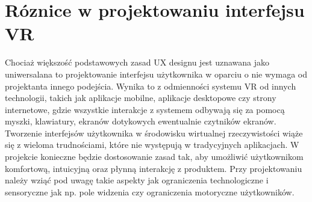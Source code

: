 \section{Róznice w projektowaniu interfejsu VR}
Chociaż większość podstawowych zasad UX designu jest uznawana jako uniwersalana to projektowanie interfejsu użytkownika w oparciu o nie wymaga od projektanta innego podejścia. Wynika to z odmienności systemu VR od innych technologii, takich jak aplikacje mobilne, aplikacje desktopowe czy strony internetowe, gdzie wszystkie interakcje z systemem odbywają się za pomocą myszki, klawiatury, ekranów dotykowych ewentualnie czytników ekranów. Tworzenie interfejsów użytkownika w środowisku wirtualnej rzeczywistości wiąże się z wieloma trudnościami, które nie występują w tradycyjnych aplikacjach. W projekcie konieczne będzie dostosowanie zasad tak, aby umożliwić użytkownikom komfortową, intuicyjną oraz płynną interakcję z produktem. Przy projektowaniu należy wziąć pod uwagę takie aspekty jak ograniczenia technologiczne i sensoryczne jak np. pole widzenia czy ograniczenia motoryczne użytkowników. 

